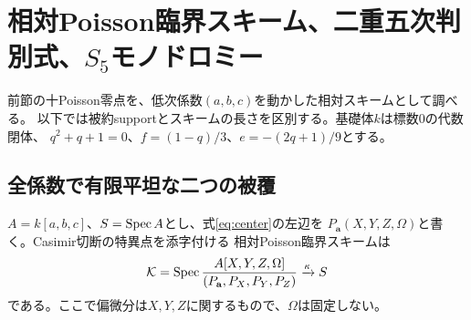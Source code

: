 \section{相対Poisson臨界スキーム、二重五次判別式、\texorpdfstring{$S_5$}{S5}モノドロミー}
\label{sec:relative-poisson-cover}
前節の十Poisson零点を、低次係数$(a,b,c)$を動かした相対スキームとして調べる。
以下では被約supportとスキームの長さを区別する。基礎体$k$は標数0の代数閉体、
$q^2+q+1=0$、$f=(1-q)/3$、$e=-(2q+1)/9$とする。

\subsection{全係数で有限平坦な二つの被覆}
$A=k[a,b,c]$、$S=\operatorname{Spec} A$とし、式\eqref{eq:center}の左辺を
$P_{\mathbf a}(X,Y,Z,\Omega)$と書く。Casimir切断の特異点を添字付ける
相対Poisson臨界スキームは
\[
 \mathcal K=\operatorname{Spec}\frac{A[X,Y,Z,\Omega]}
 {(P_{\mathbf a},P_X,P_Y,P_Z)}\xrightarrow{\kappa}S
\]
である。ここで偏微分は$X,Y,Z$に関するもので、$\Omega$は固定しない。

